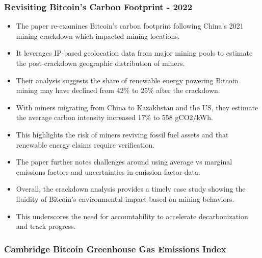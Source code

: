 \documentclass{article}
\begin{document}
\subsubsection{Revisiting Bitcoin's Carbon Footprint - 2022} \cite{devriesRevisitingBitcoinCarbon2022}
\begin{itemize}
    \item The paper re-examines Bitcoin's carbon footprint following China's 2021 mining crackdown which impacted mining locations.
    \item It leverages IP-based geolocation data from major mining pools to estimate the post-crackdown geographic distribution of miners.
    \item Their analysis suggests the share of renewable energy powering Bitcoin mining may have declined from 42\% to 25\% after the crackdown.
    \item With miners migrating from China to Kazakhstan and the US, they estimate the average carbon intensity increased 17\% to 558 gCO2/kWh.
    \item This highlights the risk of miners reviving fossil fuel assets and that renewable energy claims require verification.
    \item The paper further notes challenges around using average vs marginal emissions factors and uncertainties in emission factor data.
    \item Overall, the crackdown analysis provides a timely case study showing the fluidity of Bitcoin's environmental impact based on mining behaviors.
    \item This underscores the need for accountability to accelerate decarbonization and track progress.
\end{itemize}

\subsubsection{Cambridge Bitcoin Greenhouse Gas Emissions Index}\cite{neumuellerCambridgeBitcoinElectricity2021}
\end{document}
